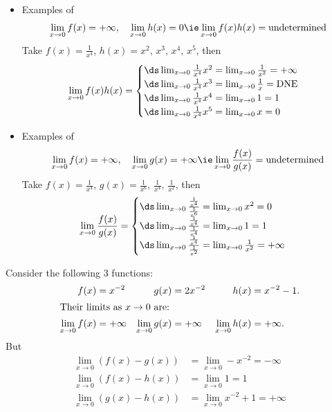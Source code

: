 \begin{itemize}
\item Examples of
\begin{align*}
  \lim_{x \to 0} f(x) = +\infty, \quad \lim_{x \to 0} h(x) = 0 \ie \lim_{x \to 0} f(x) h(x) = \text{undetermined}
\end{align*}
Take $f(x) = \frac{1}{x^4}$, $h(x) = x^2,\,x^3,\,x^4,\,x^5$, then
\begin{align*}
\lim_{x \to 0} f(x) h(x) =
\begin{cases}
\ds\lim_{x \to 0} \frac{1}{x^4} x^2 = \lim_{x \to 0} \frac{1}{x^2} = +\infty \\
\ds\lim_{x \to 0} \frac{1}{x^4} x^3 = \lim_{x \to 0} \frac{1}{x} = \text{DNE}\\
\ds\lim_{x \to 0} \frac{1}{x^4} x^4 = \lim_{x \to 0} 1 = 1                   \\
\ds\lim_{x \to 0} \frac{1}{x^4} x^5 = \lim_{x \to 0} x = 0                   \\
\end{cases}
\end{align*}
\end{itemize}
\begin{itemize}
\item Examples of
\begin{align*}
\lim_{x \to 0} f(x) = +\infty, \quad \lim_{x \to 0} g(x) = +\infty \ie \lim_{x \to 0} \frac{f(x)}{g(x)} = \text{undetermined}
\end{align*}
Take $f(x) = \frac{1}{x^4}$, $g(x) = \frac{1}{x^6},\,\frac{1}{x^4},\,\frac{1}{x^2}$, then
\begin{align*}
\lim_{x \to 0} \frac{f(x)}{g(x)} = \begin{cases}
\ds\lim_{x \to 0}\frac{\frac{1}{x^4}}{\frac{1}{x^6}} = \lim_{x \to 0} x^2 = 0 \\
\ds\lim_{x \to 0}\frac{\frac{1}{x^4}}{\frac{1}{x^4}} = \lim_{x \to 0} 1 = 1 \\
\ds\lim_{x \to 0}\frac{\frac{1}{x^4}}{\frac{1}{x^2}} = \lim_{x \to 0} \frac{1}{x^2} = +\infty
\end{cases}
\end{align*}
\end{itemize}
\begin{ex}
Consider the following 3 functions:
\begin{align*}
f(x)&=x^{-2} & g(x)&=2x^{-2} &h(x)&=x^{-2}-1. \\
\intertext{Their limits as $x \to 0$ are:}
\lim_{x\to0} f(x) &= +\infty &
\lim_{x\to0} g(x) &= +\infty &
\lim_{x\to0} h(x) &= +\infty.
\end{align*}
But
\begin{align*}
\lim_{x\to0} \left( f(x)-g(x) \right) &= \lim_{x\to0} -x^{-2} = -\infty \\
\lim_{x\to0} \left( f(x)-h(x) \right) &= \lim_{x\to0} 1 = 1 \\
\lim_{x\to0} \left( g(x)-h(x) \right) &= \lim_{x\to0} x^{-2}+1 = +\infty
\end{align*}
\end{ex}
